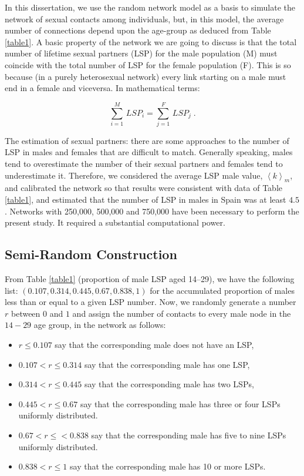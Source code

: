 In this dissertation, we use the random network model as a basis to simulate the network of sexual contacts among individuals, but, in this model, the average number of connections depend upon the age-group as deduced from Table \ref{table1}. A basic property of the network we are going to discuss is that the total number of lifetime sexual partners (LSP) for the male population (M) must
coincide with the total number of LSP for the female population (F). This is so because (in a purely heterosexual network) every link starting on a male must end in a female and viceversa. In mathematical terms:

\begin{equation}
\label{nodeseq}
\displaystyle\sum_{i=1}^M\, LSP_i=\displaystyle\sum_{j=1}^F\, LSP_j\; .
\end{equation}

The estimation of sexual partners: there are some approaches to the number of LSP in males and females \cite{chandra2013sexual,mosher2005sexual} that are difficult to match. Generally speaking, males tend to overestimate the number of their sexual partners and females tend to underestimate it. Therefore, we considered the average LSP male value, $\left\langle k \right\rangle_m$, and calibrated the network so that results were consistent with data of Table \ref{table1}, and estimated that the number of LSP in males in Spain was at least $4.5$. Networks with 250,000, 500,000 and 750,000 have been necessary to perform the present study. It required a substantial computational power.

\subsection{Semi-Random Construction}
\label{subsec22}

From Table \ref{table1} (proportion of male LSP aged 14--29), we have the following list:
$( 0.107, 0.314, 0.445, 0.67, 0.838, 1)$ for the accumulated proportion of males less than or equal to a given LSP number.
Now, we randomly generate a number $r$ between $0$ and $1$ and assign the number of contacts to every male node in the $14-29$
age group, in the network as follows:

\begin{itemize}[leftmargin=*,labelsep=5mm]
\item $r \le 0.107$ say that the corresponding male does not have an LSP,
\item $0.107 < r \le 0.314$ say that the corresponding male has one LSP,
\item $0.314 < r \le 0.445$ say that the corresponding male has two LSPs,
\item $0.445 < r \le 0.67$  say that the corresponding male has three or four LSPs uniformly distributed.
\item $0.67 < r \le < 0.838$ say that the corresponding male has five to nine LSPs uniformly distributed.
\item $0.838 < r \le 1$ say that the corresponding male has 10 or more LSPs.
\end{itemize}

